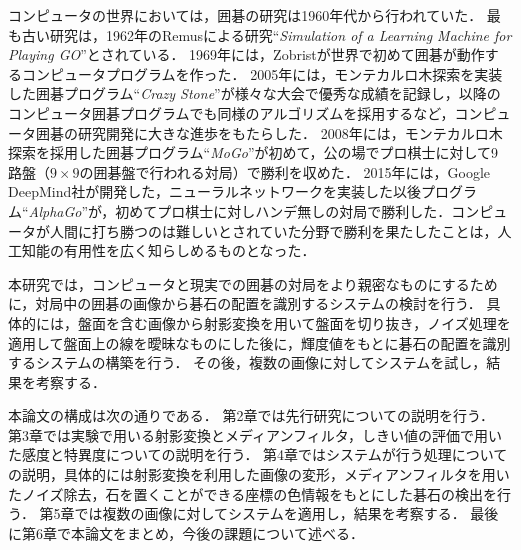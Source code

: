 \documentclass[openright]{nitocs}
\numberwithin{equation}{section}
\begin{document}
        コンピュータの世界においては，囲碁の研究は1960年代から行われていた．
        最も古い研究は，1962年のRemusによる研究``{\it Simulation of a Learning Machine for Playing GO}''\cite{Remus}とされている．
        1969年には，Zobristが世界で初めて囲碁が動作するコンピュータプログラムを作った\cite{Zobrist}．
        2005年には，モンテカルロ木探索を実装した囲碁プログラム``{\it Crazy Stone}''\cite{CrazyStone}が様々な大会で優秀な成績を記録し，以降のコンピュータ囲碁プログラムでも同様のアルゴリズムを採用するなど，コンピュータ囲碁の研究開発に大きな進歩をもたらした．
        2008年には，モンテカルロ木探索を採用した囲碁プログラム``{\it MoGo}''が初めて，公の場でプロ棋士に対して9路盤（$9\times9$の囲碁盤で行われる対局）で勝利を収めた\cite{mogo}．
        2015年には，Google DeepMind社が開発した，ニューラルネットワークを実装した以後プログラム``{\it AlphaGo}''が，初めてプロ棋士に対しハンデ無しの対局で勝利した．コンピュータが人間に打ち勝つのは難しいとされていた分野で勝利を果たしたことは，人工知能の有用性を広く知らしめるものとなった．

        本研究では，コンピュータと現実での囲碁の対局をより親密なものにするために，対局中の囲碁の画像から碁石の配置を識別するシステムの検討を行う．
        具体的には，盤面を含む画像から射影変換を用いて盤面を切り抜き，ノイズ処理を適用して盤面上の線を曖昧なものにした後に，輝度値をもとに碁石の配置を識別するシステムの構築を行う．
        その後，複数の画像に対してシステムを試し，結果を考察する．

        本論文の構成は次の通りである．
        第2章では先行研究についての説明を行う．
        第3章では実験で用いる射影変換とメディアンフィルタ，しきい値の評価で用いた感度と特異度についての説明を行う．
        第4章ではシステムが行う処理についての説明，具体的には射影変換を利用した画像の変形，メディアンフィルタを用いたノイズ除去，石を置くことができる座標の色情報をもとにした碁石の検出を行う．
        第5章では複数の画像に対してシステムを適用し，結果を考察する．
        最後に第6章で本論文をまとめ，今後の課題について述べる．
\end{document}
